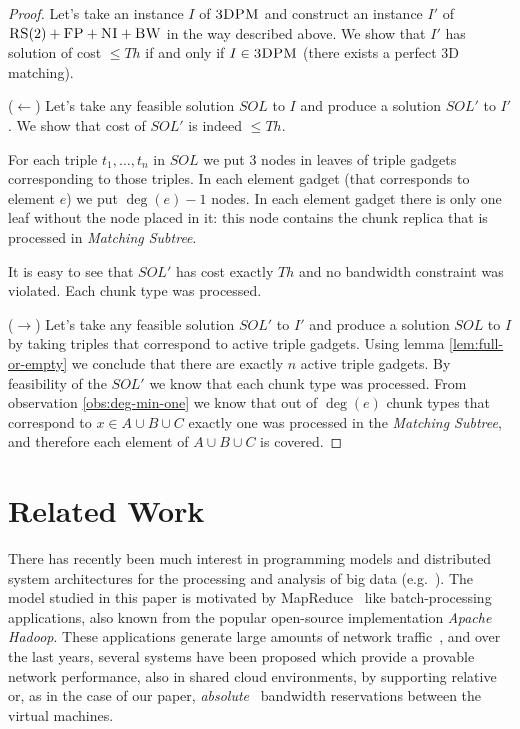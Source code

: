 \documentclass[preprint,12pt]{elsarticle}
\newcommand{\CC}{\textsc{NI}}
\newcommand{\FP}{\textsc{FP}}
\newcommand{\RS}{\textsc{RS}}
\newcommand{\BW}{\textsc{BW}}
\newcommand{\TDPM}{\textsc{3DPM}}
\newcommand{\MatchSubtree}{{\emph{Matching Subtree}}}
\newcommand{\Thr}{\ensuremath{Th}}
\newcommand{\Sol}{\ensuremath{SOL}}
\begin{document}
\begin{proof}
  Let's take an instance $I$ of $\TDPM$ and construct an instance $I'$
  of $\RS(2)+\FP+\CC+\BW$ in the way described above.  We show that
  $I'$ has solution of cost $\leq \Thr$ if and only if $I \in \TDPM$
  (there exists a perfect 3D matching).

  ($\leftarrow$) Let's take any feasible solution $\Sol$ to $I$ and
  produce a solution $\Sol'$ to $I'$. We show that cost of $\Sol'$ is
  indeed $\leq \Thr$.

  For each triple $t_1,\ldots, t_n$ in $\Sol$ we put $3$ nodes in
  leaves of triple gadgets corresponding to those triples.  In each
  element gadget (that corresponds to element $e$) we put $\deg(e)-1$
  nodes. In each element gadget there is only one leaf without the
  node placed in it: this node contains the chunk replica that is
  processed in {\MatchSubtree}.

  It is easy to see that $\Sol'$ has cost exactly $\Thr$ and no
  bandwidth constraint was violated. Each chunk type was processed.
 


  ($\rightarrow$) Let's take any feasible solution $\Sol'$ to $I'$ and
  produce a solution $\Sol$ to $I$ by taking triples that correspond
  to active triple gadgets. Using lemma \ref{lem:full-or-empty} we
  conclude that there are exactly $n$ active triple gadgets. By
  feasibility of the $\Sol'$ we know that each chunk type was
  processed. From observation \ref{obs:deg-min-one} we know that out
  of $\deg(e)$ chunk types that correspond to $x\in A\cup B\cup C$
  exactly one was processed in the {\MatchSubtree}, and therefore each
  element of $A\cup B\cup C$ is covered.

\end{proof}
\section{Related Work}\label{sec:relwork}

There has recently been much interest in programming models and distributed
system architectures for the processing and analysis of big data (e.g.~\cite{nodb,mapreduce,shark}). The model studied in
this paper is motivated by MapReduce~\cite{mapreduce} like batch-processing applications, also known
from the popular open-source implementation \emph{Apache Hadoop}.
These applications
generate large amounts of network traffic~\cite{orchestra,talk-about,amazonbw},
and over the last years, several systems have been proposed which provide
a provable network performance, also in shared cloud environments, by supporting
relative~\cite{faircloud,elasticswitch,seawall}
or, as in the case of our paper, \emph{absolute}~\cite{oktopus,secondnet,drl,gatekeeper,proteus} bandwidth reservations
between the virtual machines.
\end{document}
